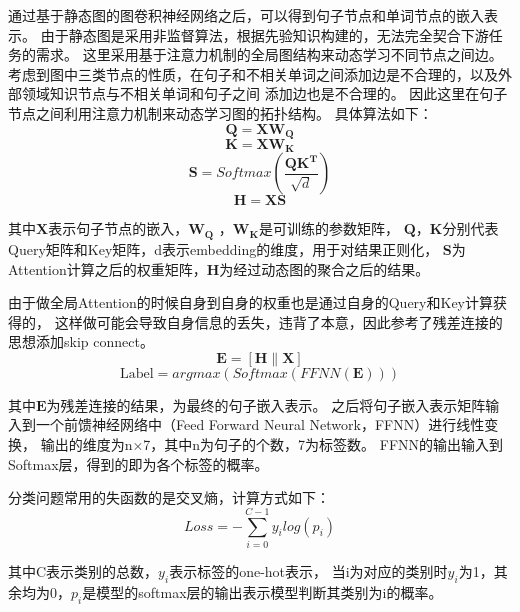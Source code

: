 通过基于静态图的图卷积神经网络之后，可以得到句子节点和单词节点的嵌入表示。
由于静态图是采用非监督算法，根据先验知识构建的，无法完全契合下游任务的需求。
这里采用基于注意力机制的全局图结构来动态学习不同节点之间边。
考虑到图中三类节点的性质，在句子和不相关单词之间添加边是不合理的，以及外部领域知识节点与不相关单词和句子之间
添加边也是不合理的。
因此这里在句子节点之间利用注意力机制来动态学习图的拓扑结构。
具体算法如下：
\begin{equation}
	\label{q}
	\mathbf{Q} = \mathbf{XW_Q}
\end{equation}
\begin{equation}
	\label{k}
	\mathbf{K} = \mathbf{XW_K}
\end{equation}
\begin{equation}
	\label{s}
	\mathbf{S} = Softmax(\frac{\mathbf{QK^T}}{\sqrt{d}})
\end{equation}
\begin{equation}
	\label{h}
	\mathbf{H=XS}
\end{equation}

其中$\mathbf{X}$表示句子节点的嵌入，$\mathbf{W_Q}$ ，$\mathbf{W_K}$是可训练的参数矩阵，
$\mathbf{Q}$，$\mathbf{K}$分别代表Query矩阵和Key矩阵，d表示embedding的维度，用于对结果正则化，
$\mathbf{S}$为Attention计算之后的权重矩阵，$\mathbf{H}$为经过动态图的聚合之后的结果。

由于做全局Attention的时候自身到自身的权重也是通过自身的Query和Key计算获得的，
这样做可能会导致自身信息的丢失，违背了本意，因此参考了残差连接的思想添加skip connect。
\begin{equation}
	\label{resnet}
	\mathbf{E=[H\|X]}
\end{equation}
\begin{equation}
	\label{fnn}
	\text{Label} = argmax(Softmax(FFNN(\mathbf{E})))
\end{equation}

其中$\mathbf{E}$为残差连接的结果，为最终的句子嵌入表示。
之后将句子嵌入表示矩阵输入到一个前馈神经网络中（Feed Forward Neural Network，FFNN）进行线性变换，
输出的维度为n×7，其中n为句子的个数，7为标签数。
FFNN的输出输入到Softmax层，得到的即为各个标签的概率。

分类问题常用的失函数的是交叉熵，计算方式如下：
\begin{equation}
	\label{ce}
	Loss = -\sum_{i=0}^{C-1}y_ilog(p_i)
\end{equation}

其中C表示类别的总数，$y_i$表示标签的one-hot表示，
当i为对应的类别时$y_i$为1，其余均为0，$p_i$是模型的softmax层的输出表示模型判断其类别为i的概率。

